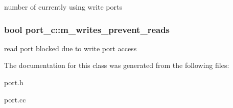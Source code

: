 \label{classport__c_a2f3b34b182e72b0f371651c0d433cc50}
number of currently using write ports \hypertarget{classport__c_a5cb3565a6b897c5e059e25e33cff849a}{
\subsubsection[{m\_\-writes\_\-prevent\_\-reads}]{\setlength{\rightskip}{0pt plus 5cm}bool {\bf port\_\-c::m\_\-writes\_\-prevent\_\-reads}}}
\label{classport__c_a5cb3565a6b897c5e059e25e33cff849a}
read port blocked due to write port access 

The documentation for this class was generated from the following files:\begin{DoxyCompactItemize}
\item 
port.h\item 
port.cc\end{DoxyCompactItemize}
